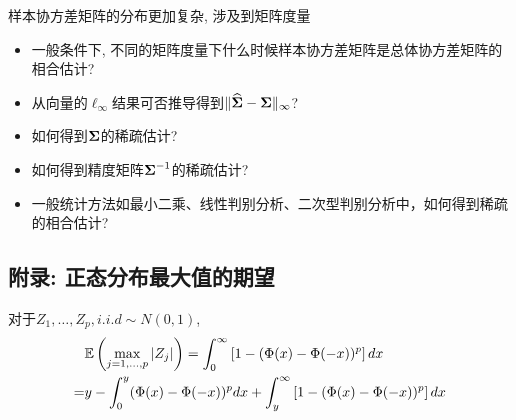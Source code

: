 \begin{remark}
	样本协方差矩阵的分布更加复杂, 涉及到矩阵度量	
	\begin{itemize}
		\item 一般条件下, 不同的矩阵度量下什么时候样本协方差矩阵是总体协方差矩阵的相合估计?
		\item 从向量的$\ell_\infty$结果可否推导得到$\|\mbox{$\widehat{\mbox{\boldmath $\Sigma$}}$}-\mbox{\boldmath $\Sigma$}\|_\infty$?
		\item 如何得到$\mbox{\boldmath $\Sigma$}$的稀疏估计?
		\item 如何得到精度矩阵$\mbox{\boldmath $\Sigma$}^{-1}$的稀疏估计?
		\item 一般统计方法如最小二乘、线性判别分析、二次型判别分析中，如何得到稀疏的相合估计?
	\end{itemize}
\end{remark}


\subsection{附录: 正态分布最大值的期望}
对于$Z_1,\ldots,Z_p,i.i.d \sim N(0,1)$,
\begin{align*}
	&\mathbb{E} \left( \max_{j=1,\ldots,p} |Z_j| \right)=\int_0^\infty \left[ 1-(\Phi(x)-\Phi(-x))^p\right]dx\\
	=&y-\int_0^y(\Phi(x)-\Phi(-x))^p dx +\int_y^\infty \left[ 1-(\Phi(x)-\Phi(-x))^p\right]dx
\end{align*}

